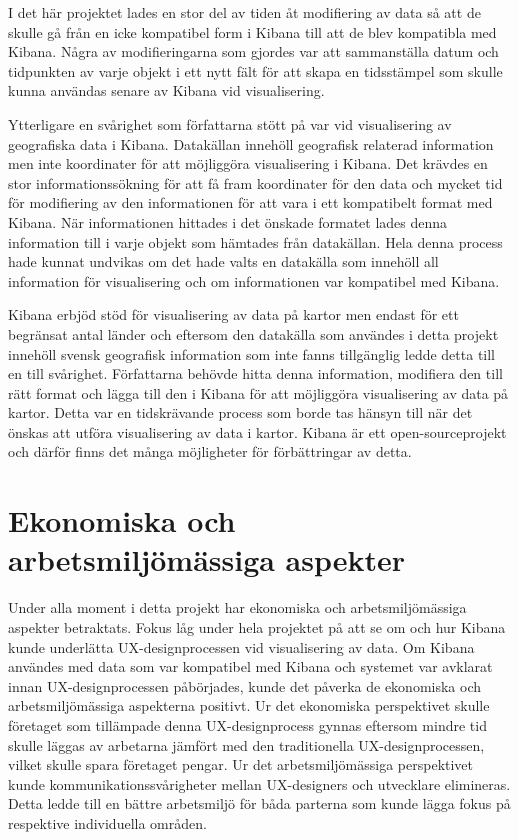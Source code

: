 \documentclass[12pt]{kththesis}
\begin{document}
I det här projektet lades en stor del av tiden åt modifiering av data så att de skulle gå från en icke kompatibel form i Kibana till att de blev kompatibla med Kibana. Några av modifieringarna som gjordes var att sammanställa datum och tidpunkten av varje objekt i ett nytt fält för att skapa en tidsstämpel som skulle kunna användas senare av Kibana vid visualisering. 

Ytterligare en svårighet som författarna stött på var vid visualisering av geografiska data i Kibana. Datakällan innehöll geografisk relaterad information men inte koordinater för att möjliggöra visualisering i Kibana. Det krävdes en stor informationssökning för att få fram koordinater för den data och mycket tid för modifiering av den informationen för att vara i ett kompatibelt format med Kibana. När informationen hittades i det önskade formatet lades denna information till i varje objekt som hämtades från datakällan. Hela denna process hade kunnat undvikas om det hade valts en datakälla som innehöll all information för visualisering och om informationen var kompatibel med Kibana.

Kibana erbjöd stöd för visualisering av data på kartor men endast för ett begränsat antal länder och eftersom den datakälla som användes i detta projekt innehöll svensk geografisk information som inte fanns tillgänglig ledde detta till en till svårighet. Författarna behövde hitta denna information, modifiera den till rätt format och lägga till den i Kibana för att möjliggöra visualisering av data på kartor. Detta var en tidskrävande process som borde tas hänsyn till när det önskas att utföra visualisering av data i kartor. Kibana är ett open-sourceprojekt och därför finns det många möjligheter för förbättringar av detta.  

\section{Ekonomiska och arbetsmiljömässiga aspekter}
Under alla moment i detta projekt har ekonomiska och arbetsmiljömässiga aspekter betraktats. Fokus låg under hela projektet på att se om och hur Kibana kunde underlätta UX-designprocessen vid visualisering av data. Om Kibana användes med data som var kompatibel med Kibana och systemet var avklarat innan UX-designprocessen påbörjades, kunde det påverka de ekonomiska och arbetsmiljömässiga aspekterna positivt. Ur det ekonomiska perspektivet skulle företaget som tillämpade denna UX-designprocess gynnas eftersom mindre tid skulle läggas av arbetarna jämfört med den traditionella UX-designprocessen, vilket skulle spara företaget pengar. Ur det arbetsmiljömässiga perspektivet kunde kommunikationssvårigheter mellan UX-designers och utvecklare elimineras. Detta ledde till en bättre arbetsmiljö för båda parterna som kunde lägga fokus på respektive individuella områden.
\end{document}
